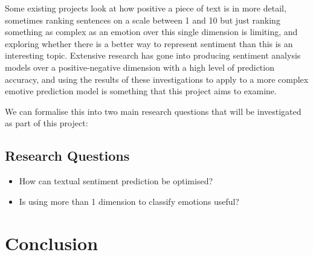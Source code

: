 \documentclass{article}
\begin{document}
Some existing projects look at how positive a piece of text is in more detail, sometimes ranking sentences on a scale between 1 and 10 but just ranking something as complex as an emotion over this single dimension is limiting, and exploring whether there is a better way to represent sentiment than this is an interesting topic.
Extensive research has gone into producing sentiment analysis models over a positive-negative dimension with a high level of prediction accuracy, and using the results of these investigations to apply to a more complex emotive prediction model is something that this project aims to examine.

We can formalise this into two main research questions that will be investigated as part of this project:

\subsection{Research Questions}
\begin{itemize}
    \item How can textual sentiment prediction be optimised?
    \item Is using more than 1 dimension to classify emotions useful?
\end{itemize}



\section{Conclusion}

\pagebreak






\end{document}
